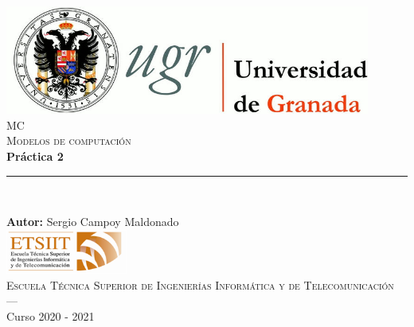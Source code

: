 \begin{titlepage}
 
 
\newlength{\centeroffset}
\setlength{\centeroffset}{-0.5\oddsidemargin}
\addtolength{\centeroffset}{0.5\evensidemargin}
\thispagestyle{empty}

\noindent\hspace*{\centeroffset}\begin{minipage}{\textwidth}

\centering
\includegraphics[width=0.9\textwidth]{imagenes/logo_ugr.jpg}\\[1.4cm]

\textsc{ \Large MC \\[0.2cm]}
\textsc{ Modelos de computación}\\[1cm]
% 
{\Huge\bfseries Práctica 2\\
}
\noindent\rule[-1ex]{\textwidth}{3pt}\\[3.5ex]
\end{minipage}

\vspace{2.5cm}
\noindent\hspace*{\centeroffset}\begin{minipage}{\textwidth}
\centering

\textbf{Autor: }{Sergio Campoy Maldonado}\\[4cm]
\includegraphics[width=0.3\textwidth]{imagenes/etsiit_logo.png}\\[0.1cm]
\textsc{Escuela Técnica Superior de Ingenierías Informática y de Telecomunicación}\\
\textsc{---}\\
Curso 2020 - 2021
\end{minipage}
\end{titlepage}


